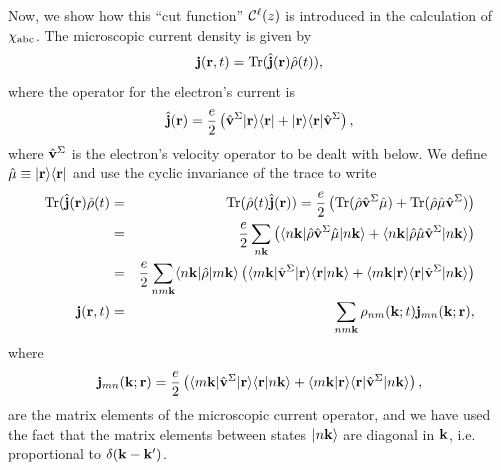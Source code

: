 \documentclass[floatfix,prb,aps,superscriptaddress,11pt,preprint]{revtex4}
\begin{document}
Now, we show how this ``cut function'' ${\mathbf{\cal C}}^\ell(z)$ is introduced in
the calculation of $\chi_{\mathrm{a}\mathrm{b}\mathrm{c}}$.
The microscopic current density is given by
\begin{equation}\label{jmic}
\mathbf{j}(\mathbf{r},t)=\mathrm{Tr}(\hat{\mathbf{j}}(\mathbf{r})\hat\rho(t)),
\end{equation}
where the operator for the electron's current is
\begin{equation}\label{hatjmic}
\hat{\mathbf{j}}(\mathbf{r})=\frac{e}{2}\left(\hat{\mathbf{v}}^\Sigma| \mathbf{r} \rangle\langle \mathbf{r} |
+| \mathbf{r} \rangle\langle \mathbf{r} |\hat{\mathbf{v}}^\Sigma\right), 
\end{equation}
where $\hat{\mathbf{v}}^\Sigma$ is the electron's velocity operator to be dealt
with below. We define
$\hat\mu\equiv| \mathbf{r} \rangle\langle \mathbf{r} |$ and use the cyclic invariance of
the trace to write
\begin{eqnarray}\label{jmic2}
\mathrm{Tr}(\hat{\mathbf{j}}(\mathbf{r})\hat\rho(t)&=&\mathrm{Tr}(\hat\rho(t)\hat{\mathbf{j}}(\mathbf{r}))=
\frac{e}{2}
\left(
\mathrm{Tr}(\hat\rho\hat{\mathbf{v}}^\Sigma\hat\mu)
+
\mathrm{Tr}(\hat\rho\hat\mu\hat{\mathbf{v}}^\Sigma)
\right)
\nonumber\\
&=&
\frac{e}{2}
\sum_{n\mathbf{k}}
\left(
\langle n\mathbf{k} |\hat\rho\hat{\mathbf{v}}^\Sigma\hat\mu| n\mathbf{k} \rangle
+
\langle n\mathbf{k} |\hat\rho\hat\mu\hat{\mathbf{v}}^\Sigma| n\mathbf{k} \rangle
\right)
\nonumber\\
&=&
\frac{e}{2}
\sum_{nm\mathbf{k}}
\langle n\mathbf{k} |\hat\rho| m\mathbf{k} \rangle
\left(
\langle m\mathbf{k} |\hat{\mathbf{v}}^\Sigma| \mathbf{r} \rangle\langle {\mathbf{r}} | {n\mathbf{k}} \rangle
+
\langle {m\mathbf{k}} | {\mathbf{r}} \rangle\langle \mathbf{r} |\hat{\mathbf{v}}^\Sigma| n\mathbf{k} \rangle
\right)
\nonumber\\
\mathbf{j}(\mathbf{r},t)&=&
\sum_{nm\mathbf{k}}
\rho_{nm}(\mathbf{k};t)\mathbf{j}_{mn}(\mathbf{k};\mathbf{r}),
\end{eqnarray}
where
\begin{equation}\label{jmic3}
\mathbf{j}_{mn}(\mathbf{k};\mathbf{r})=
\frac{e}{2}
\left(
\langle m\mathbf{k} |\hat{\mathbf{v}}^\Sigma| \mathbf{r} \rangle\langle {\mathbf{r}} | {n\mathbf{k}} \rangle
+
\langle {m\mathbf{k}} | {\mathbf{r}} \rangle\langle \mathbf{r} |\hat{\mathbf{v}}^\Sigma| n\mathbf{k} \rangle
\right),
\end{equation}
are the matrix elements of the microscopic current operator,
and we have used the fact that the matrix elements between states $| n\mathbf{k} \rangle$
are diagonal in $\mathbf{k}$, i.e. proportional to $\delta(\mathbf{k}-\mathbf{k}')$.
\end{document}
